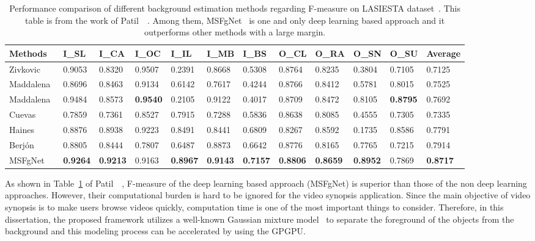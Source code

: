 \documentclass[11pt]{hyu_thesis}
\begin{document}
\begin{table}
	\centering
	\begin{tabular}{llllllllllll}
		\hline\hline
		Methods & I\_SL & I\_CA & I\_OC & I\_IL & I\_MB & I\_BS & O\_CL & O\_RA & O\_SN & O\_SU & Average \\
		\hline\hline
		Zivkovic~\cite{Zivkovic2006} & 0.9053  & 0.8320 & 0.9507 & 0.2391 & 0.8668 & 0.5308 & 0.8764 & 0.8235 & 0.3804 & 0.7105 & 0.7125 \\
		\hline
		Maddalena~\cite{maddalena2008self} & 0.8696 & 0.8463 & 0.9134 & 0.6142 & 0.7617 & 0.4244 & 0.8766 & 0.8412 & 0.5781 & 0.8015 & 0.7525 \\
		\hline
		Maddalena~\cite{maddalena2012sobs} & 0.9484 & 0.8573 & \bfseries 0.9540 & 0.2105 & 0.9122 & 0.4017 & 0.8709 & 0.8472 & 0.8105 & \bfseries 0.8795 & 0.7692 \\
		\hline
		Cuevas~\cite{cuevas2013improved} & 0.7859 & 0.7361 & 0.8527 & 0.7915 & 0.7288 & 0.5836 & 0.8638 & 0.8085 & 0.4555 & 0.7305 & 0.7335 \\
		\hline
		Haines~\cite{haines2014background} & 0.8876 & 0.8938 & 0.9223 & 0.8491 & 0.8441 & 0.6809 & 0.8267 & 0.8592 & 0.1735 & 0.8586 & 0.7791 \\
		\hline
		Berj{\'o}n~\cite{berjon2018real} & 0.8805 & 0.8444 & 0.7807 & 0.6487 & 0.8873 & 0.6642 & 0.8776 & 0.8165 & 0.7765 & 0.7215 & 0.7914 \\
		\hline
		MSFgNet~\cite{Patil2018} & \bfseries 0.9264 & \bfseries 0.9213 & 0.9163 & \bfseries 0.8967 & \bfseries 0.9143 & \bfseries 0.7157 & \bfseries 0.8806 & \bfseries 0.8659 & \bfseries 0.8952 & 0.7869 & \bfseries 0.8717 \\
		\hline
	\end{tabular}
	\caption{Performance comparison of different background estimation methods regarding F-measure on LASIESTA dataset~\cite{cuevas2016labeled}. This table is from the work of Patil~\etal~\cite{Patil2018}. Among them, MSFgNet~\cite{Patil2018} is one and only deep learning based approach and it outperforms other methods with a large margin.}
	\label{tb:bg_fmeasure}
\end{table}
As shown in Table~\ref{tb:bg_fmeasure} of Patil~\etal~\cite{Patil2018}, F-measure of the deep learning based approach (MSFgNet) is superior than those of the non deep learning approaches. However, their computational burden is hard to be ignored for the video synopsis application. Since the main objective of video synopsis is to make users browse videos quickly, computation time is one of the most important things to consider. Therefore, in this dissertation, the proposed framework utilizes a well-known Gaussian mixture model~\cite{Zivkovic2004,Zivkovic2006} to separate the foreground of the objects from the background and this modeling process can be accelerated by using the GPGPU.
\end{document}

